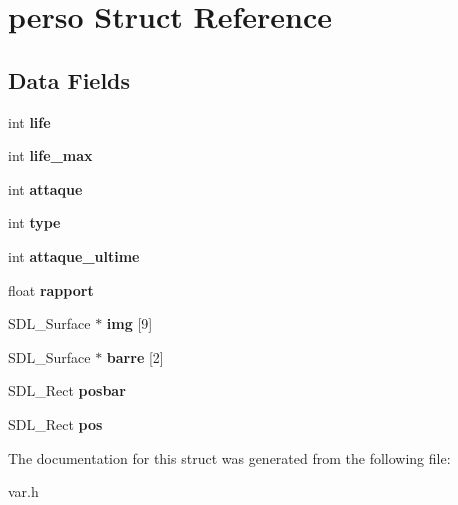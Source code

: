 \hypertarget{structperso}{\section{perso Struct Reference}
\label{structperso}
}
\subsection*{Data Fields}
\begin{DoxyCompactItemize}
\item 
\hypertarget{structperso_adf488ff0ce8098cd956c07890cbc5d50}{int {\bfseries life}}\label{structperso_adf488ff0ce8098cd956c07890cbc5d50}

\item 
\hypertarget{structperso_ad1c144a8e042de716cd415043ffd9783}{int {\bfseries life\-\_\-max}}\label{structperso_ad1c144a8e042de716cd415043ffd9783}

\item 
\hypertarget{structperso_abc0d66ae0d3749bb2c7df3b685dd5453}{int {\bfseries attaque}}\label{structperso_abc0d66ae0d3749bb2c7df3b685dd5453}

\item 
\hypertarget{structperso_ac765329451135abec74c45e1897abf26}{int {\bfseries type}}\label{structperso_ac765329451135abec74c45e1897abf26}

\item 
\hypertarget{structperso_a22d1d01a219ba9b999168ee305efe2af}{int {\bfseries attaque\-\_\-ultime}}\label{structperso_a22d1d01a219ba9b999168ee305efe2af}

\item 
\hypertarget{structperso_aac59a0fe3f3c352f33c38cff4f054a8d}{float {\bfseries rapport}}\label{structperso_aac59a0fe3f3c352f33c38cff4f054a8d}

\item 
\hypertarget{structperso_ae3c942dc5fc54b7080aa4aaa84f9abe9}{S\-D\-L\-\_\-\-Surface $\ast$ {\bfseries img} \mbox{[}9\mbox{]}}\label{structperso_ae3c942dc5fc54b7080aa4aaa84f9abe9}

\item 
\hypertarget{structperso_aa1d8587a83d5b37ee57c7ff626633487}{S\-D\-L\-\_\-\-Surface $\ast$ {\bfseries barre} \mbox{[}2\mbox{]}}\label{structperso_aa1d8587a83d5b37ee57c7ff626633487}

\item 
\hypertarget{structperso_ac9a6e81327fbf1b57e8f5cb111d4d547}{S\-D\-L\-\_\-\-Rect {\bfseries posbar}}\label{structperso_ac9a6e81327fbf1b57e8f5cb111d4d547}

\item 
\hypertarget{structperso_a294c5492db3ece725b68947cafdaafec}{S\-D\-L\-\_\-\-Rect {\bfseries pos}}\label{structperso_a294c5492db3ece725b68947cafdaafec}

\end{DoxyCompactItemize}


The documentation for this struct was generated from the following file\-:\begin{DoxyCompactItemize}
\item 
var.\-h\end{DoxyCompactItemize}
